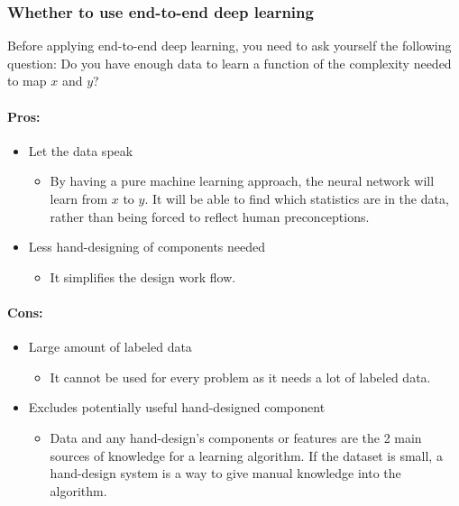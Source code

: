\documentclass[UTF8]{article}
\begin{document}
\subsubsection{Whether to use end-to-end deep learning}
Before applying end-to-end deep learning, you need to ask yourself the following question: Do you
have enough data to learn a function of the complexity needed to map $x$ and $y$?

\paragraph{Pros:}
\begin{itemize}
    \item Let the data speak
    \begin{itemize}
        \item By having a pure machine learning approach, the neural network will learn from $x$ to
        $y$. It will be able to find which statistics are in the data, rather than being forced to
        reflect human preconceptions.
    \end{itemize}
    \item Less hand-designing of components needed
    \begin{itemize}
        \item It simplifies the design work flow.
    \end{itemize}
\end{itemize}

\paragraph{Cons:}
\begin{itemize}
    \item Large amount of labeled data
    \begin{itemize}
        \item It cannot be used for every problem as it needs a lot of labeled data.
    \end{itemize}
    \item Excludes potentially useful hand-designed component
    \begin{itemize}
        \item Data and any hand-design's components or features are the 2 main sources of knowledge
        for a learning algorithm. If the dataset is small, a hand-design system is a way to give
        manual knowledge into the algorithm.
    \end{itemize}
\end{itemize}
\end{document}
